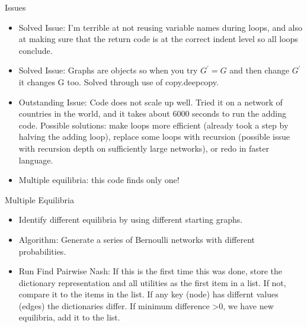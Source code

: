\documentclass{beamer}
\begin{document}
\begin{frame}{Issues}
\begin{itemize}
\item Solved Issue: I'm terrible at not reusing variable names during loops, and also at making sure that the return code is at the correct indent level so all loops conclude.
\item Solved Issue: Graphs are objects so when you try $G^{'} = G$ and then change $G^{'}$ it changes G too. Solved through use of copy.deepcopy.
\item Outstanding Issue: Code does not scale up well. Tried it on a network of countries in the world, and it takes about 6000 seconds to run the adding code. Possible solutions: make loops more efficient (already took a step by halving the adding loop), replace some loops with recursion (possible issue with recursion depth on sufficiently large networks), or redo in faster language.
\item Multiple equilibria: this code finds only one!
\end{itemize}
\end{frame}

\begin{frame}{Multiple Equilibria}
\begin{itemize}
\item Identify different equilibria by using different starting graphs.
\item Algorithm: Generate a series of Bernoulli networks with different probabilities.
\item Run Find Pairwise Nash: If this is the first time this was done, store the dictionary representation and all utilities as the first item in a list. If not, compare it to the items in the list. If any key (node) has differnt values (edges) the dictionaries differ. If minimum difference >0, we have new equilibria, add it to the list.
\end{itemize}
\end{frame}
\end{document}
